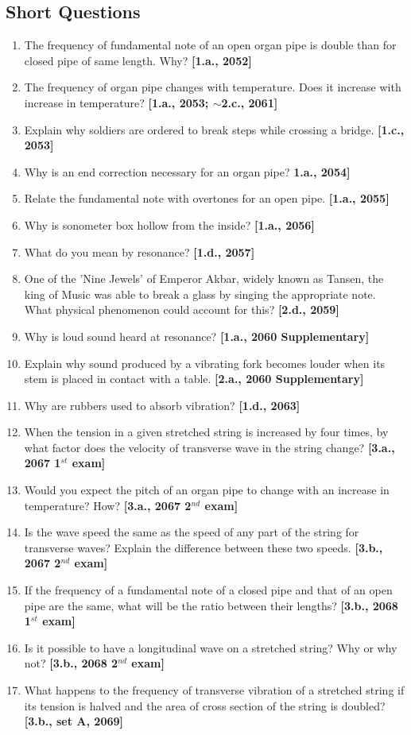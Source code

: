 \documentclass[a4paper,10pt]{report}
\begin{document}
 \subsection{Short Questions}
  \begin{enumerate}
   \item The frequency of fundamental note of an open organ pipe is double than for closed pipe of same length. Why?
    \textbf{[1.a., 2052]}
   \item The frequency of organ pipe changes with temperature. Does it increase with increase in temperature? 
    \textbf{[1.a., 2053; $\sim$2.c., 2061]}
   \item Explain why soldiers are ordered to break steps while crossing a bridge. \textbf{[1.c., 2053]}
   \item Why is an end correction necessary for an organ pipe? \textbf{1.a., 2054]}
   \item Relate the fundamental note with overtones for an open pipe. \textbf{[1.a., 2055]}
   \item Why is sonometer box hollow from the inside? \textbf{[1.a., 2056]}
   \item What do you mean by resonance? \textbf{[1.d., 2057]}
   \item One of the 'Nine Jewels' of Emperor Akbar, widely known as Tansen, the king of Music was able to break a glass
    by singing the appropriate note. What physical phenomenon could account for this? \textbf{[2.d., 2059]}
   \item Why is loud sound heard at resonance? \textbf{[1.a., 2060 Supplementary]}
   \item Explain why sound produced by a vibrating fork becomes louder when its stem is placed in contact with a table.
    \textbf{[2.a., 2060 Supplementary]}
   \item Why are rubbers used to absorb vibration? \textbf{[1.d., 2063]}
   \item When the tension in a given stretched string is increased by four times, by what factor does the velocity of
    transverse wave in the string change? \textbf{[3.a., 2067 1$^{st}$ exam]}
   \item Would you expect the pitch of an organ pipe to change with an increase in temperature? How? 
    \textbf{[3.a., 2067 2$^{nd}$ exam]}
   \item Is the wave speed the same as the speed of any part of the string for transverse waves? Explain the difference
    between these two speeds. \textbf{[3.b., 2067 2$^{nd}$ exam]}
   \item If the frequency of a fundamental note of a closed pipe and that of an open pipe are the same, what will be the
    ratio between their lengths? \textbf{[3.b., 2068 1$^{st}$ exam]}
   \item Is it possible to have a longitudinal wave on a stretched string? Why or why not? \textbf{[3.b., 2068 2$^{nd}$ exam]}
   \item What happens to the frequency of transverse vibration of a stretched string if its tension is halved and the 
    area of cross section of the string is doubled? \textbf{[3.b., set A, 2069]}
  \end{enumerate}
 
\end{document}
